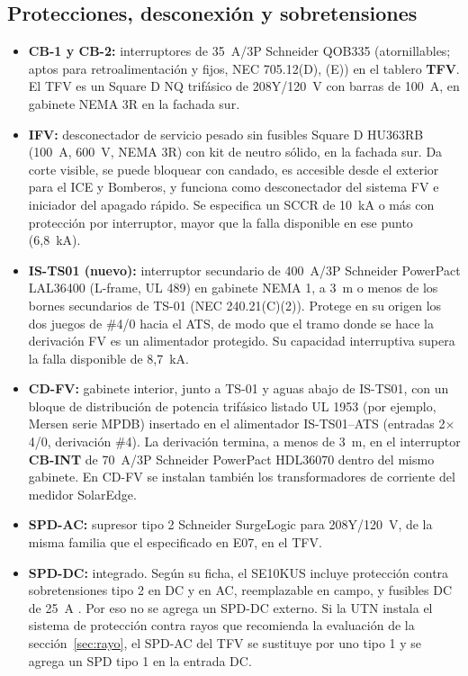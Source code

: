 \documentclass[12pt]{article}
\begin{document}
\subsection{Protecciones, desconexión y sobretensiones}
\begin{itemize}
\item \textbf{CB-1 y CB-2:} interruptores de 35~A/3P Schneider QOB335 (atornillables; aptos para retroalimentación y fijos, NEC 705.12(D), (E)) en el tablero \textbf{TFV}. El TFV es un Square D NQ trifásico de 208Y/120~V con barras de 100~A, en gabinete NEMA 3R en la fachada sur.
\item \textbf{IFV:} desconectador de servicio pesado sin fusibles Square D HU363RB (100~A, 600~V, NEMA 3R) con kit de neutro sólido, en la fachada sur. Da corte visible, se puede bloquear con candado, es accesible desde el exterior para el ICE y Bomberos, y funciona como desconectador del sistema FV e iniciador del apagado rápido. Se especifica un SCCR de 10~kA o más con protección por interruptor, mayor que la falla disponible en ese punto (6,8~kA).
\item \textbf{IS-TS01 (nuevo):} interruptor secundario de 400~A/3P Schneider PowerPact LAL36400 (L-frame, UL 489) en gabinete NEMA 1, a 3~m o menos de los bornes secundarios de TS-01 (NEC 240.21(C)(2)). Protege en su origen los dos juegos de \#4/0 hacia el ATS, de modo que el tramo donde se hace la derivación FV es un alimentador protegido. Su capacidad interruptiva supera la falla disponible de 8,7~kA.
\item \textbf{CD-FV:} gabinete interior, junto a TS-01 y aguas abajo de IS-TS01, con un bloque de distribución de potencia trifásico listado UL 1953 (por ejemplo, Mersen serie MPDB) insertado en el alimentador IS-TS01--ATS (entradas 2$\times$4/0, derivación \#4). La derivación termina, a menos de 3~m, en el interruptor \textbf{CB-INT} de 70~A/3P Schneider PowerPact HDL36070 dentro del mismo gabinete. En CD-FV se instalan también los transformadores de corriente del medidor SolarEdge.
\item \textbf{SPD-AC:} supresor tipo 2 Schneider SurgeLogic para 208Y/120~V, de la misma familia que el especificado en E07, en el TFV.
\item \textbf{SPD-DC:} integrado. Según su ficha, el SE10KUS incluye protección contra sobretensiones tipo 2 en DC y en AC, reemplazable en campo, y fusibles DC de 25~A \cite{seInv}. Por eso no se agrega un SPD-DC externo. Si la UTN instala el sistema de protección contra rayos que recomienda la evaluación de la sección~\ref{sec:rayo}, el SPD-AC del TFV se sustituye por uno tipo 1 y se agrega un SPD tipo 1 en la entrada DC.
\end{itemize}
\end{document}
